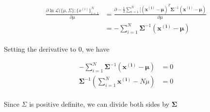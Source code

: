 \documentclass[11pt]{article}
\begin{document}
{\begin{equation}
    \begin{split}
        \frac{\partial  { \ln \mathcal{L}( \{ \mu, \Sigma \}; \{ x^{(i)}\}_{i = 1}^N}}{\partial \mu}&=\frac{\partial  -\frac{1}{2}\sum\limits_{i=1}^N [( \mathbf{x^{(i)}} - \mathbf{\mu})^T
	 	\mathbf{\Sigma}^{-1} ( \mathbf{x^{(i)}} - \mathbf{\mu})}{\partial \mu}\\
	 	&=   -\sum\limits_{i=1}^N 
	 	\mathbf{\Sigma}^{-1} ( \mathbf{x^{(i)}} - \mathbf{\mu})
    \end{split}
\end{equation}
\ \\
Setting the derivative to 0, we have

\begin{align*}
    -\sum\limits_{i=1}^N 
	 	\mathbf{\Sigma}^{-1} ( \mathbf{x^{(i)}} - \mathbf{\mu}) &= 0\\
	 	\mathbf{\Sigma}^{-1}(\sum\limits_{i=1}^N \mathbf{x^{(i)}} - N \mu) &= 0
\end{align*}
\ \\
Since $\Sigma$ is positive definite, we can divide both sides by $\mathbf{\Sigma}$

}
\end{document}
